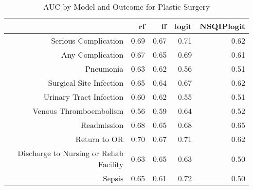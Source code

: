 \begin{table}[ht]
\centering
\begin{tabular}{rrrrr}
  \hline
 & rf & ff & logit & NSQIPlogit \\ 
  \hline
Serious Complication & 0.69 & 0.67 & 0.71 & 0.62 \\ 
  Any Complication & 0.67 & 0.65 & 0.69 & 0.61 \\ 
  Pneumonia & 0.63 & 0.62 & 0.56 & 0.51 \\ 
  Surgical Site Infection & 0.65 & 0.64 & 0.67 & 0.62 \\ 
  Urinary Tract Infection & 0.60 & 0.62 & 0.55 & 0.51 \\ 
  Venous Thromboembolism & 0.56 & 0.59 & 0.64 & 0.52 \\ 
  Readmission & 0.68 & 0.65 & 0.68 & 0.65 \\ 
  Return to OR & 0.70 & 0.67 & 0.71 & 0.62 \\ 
  Discharge to Nursing or Rehab Facility & 0.63 & 0.65 & 0.63 & 0.50 \\ 
  Sepsis & 0.65 & 0.61 & 0.72 & 0.50 \\ 
   \hline
\end{tabular}
\caption{AUC by Model and Outcome for Plastic Surgery} 
\end{table}
